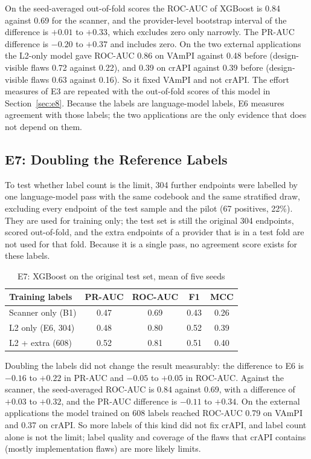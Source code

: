 \documentclass[conference]{IEEEtran}
\begin{document}
On the seed-averaged out-of-fold scores the ROC-AUC of XGBoost is 0.84 against 0.69 for the scanner, and the
provider-level bootstrap interval of the difference is $+0.01$ to $+0.33$, which excludes zero only narrowly.
The PR-AUC difference is $-0.20$ to $+0.37$ and includes zero. On the two external applications the
L2-only model gave ROC-AUC 0.86 on VAmPI against 0.48 before (design-visible flaws 0.72 against 0.22), and 0.39 on crAPI
against 0.39 before (design-visible flaws 0.63 against 0.16). So it fixed VAmPI and not crAPI. The effort measures of E3 are repeated with the out-of-fold scores of this model in Section~\ref{sec:e8}. Because the labels are language-model labels, E6 measures agreement
with those labels; the two applications are the only evidence that does not depend on them.

\subsection{E7: Doubling the Reference Labels}
\label{sec:e7}
To test whether label count is the limit, 304 further endpoints were labelled by one language-model pass with the same
codebook and the same stratified draw, excluding every endpoint of the test sample and the pilot (67 positives, 22\%). They are used for
training only; the test set is still the original 304 endpoints, scored out-of-fold, and the extra endpoints of a provider that is in a
test fold are not used for that fold. Because it is a single pass, no agreement score exists for these labels.

\begin{table}[!t]
\caption{E7: XGBoost on the original test set, mean of five seeds}
\label{tab:e7}
\centering
\footnotesize
\begin{tabular}{lcccc}
\toprule
\textbf{Training labels} & \textbf{PR-AUC} & \textbf{ROC-AUC} & \textbf{F1} & \textbf{MCC}\\
\midrule
Scanner only (B1) & 0.47 & 0.69 & 0.43 & 0.26\\
L2 only (E6, 304) & 0.48 & 0.80 & 0.52 & 0.39\\
L2 + extra (608) & 0.52 & 0.81 & 0.51 & 0.40\\
\bottomrule
\end{tabular}
\end{table}

Doubling the labels did not change the result measurably: the difference to E6 is $-0.16$ to $+0.22$ in PR-AUC and $-0.05$ to $+0.05$
in ROC-AUC. Against the scanner, the seed-averaged ROC-AUC is 0.84 against 0.69, with a difference of $+0.03$ to $+0.32$, and the PR-AUC
difference is $-0.11$ to $+0.34$. On the external applications the model trained on 608 labels reached ROC-AUC 0.79 on VAmPI and
0.37 on crAPI. So more labels of this kind did not fix crAPI, and label count alone is not the limit; label quality and coverage of the
flaws that crAPI contains (mostly implementation flaws) are more likely limits.
\end{document}

